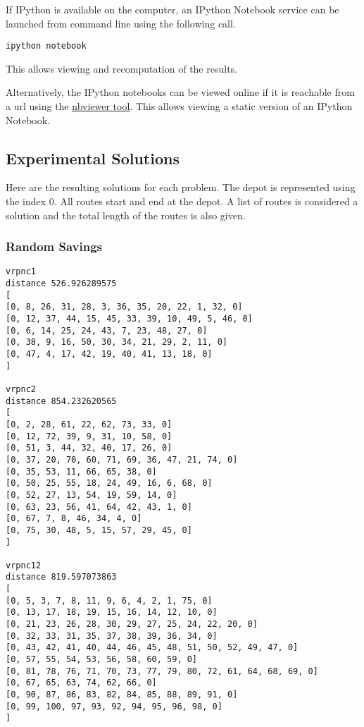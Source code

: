 \documentclass{article} %
\begin{document}
{If IPython is available on the computer, an IPython Notebook service can be launched from command line using the following call.

\begin{verbatim}
ipython notebook    
\end{verbatim}

This allows viewing and recomputation of the results.\newline


Alternatively, the IPython notebooks can be viewed online if it is reachable from a url using the \href{http://nbviewer.IPython.org/}{nbviewer tool}. This allows viewing a static version of an IPython Notebook.



\newpage
\subsection{Experimental Solutions}
Here are the resulting solutions for each problem. The depot is represented using the index 0. All routes start and end at the depot. A list of routes is considered a solution and the total length of the routes is also given.


\subsubsection{Random Savings}
\begin{lstlisting}[breaklines, basicstyle=\tiny]
vrpnc1
distance 526.926289575
[
[0, 8, 26, 31, 28, 3, 36, 35, 20, 22, 1, 32, 0]
[0, 12, 37, 44, 15, 45, 33, 39, 10, 49, 5, 46, 0]
[0, 6, 14, 25, 24, 43, 7, 23, 48, 27, 0]
[0, 38, 9, 16, 50, 30, 34, 21, 29, 2, 11, 0]
[0, 47, 4, 17, 42, 19, 40, 41, 13, 18, 0]
]

vrpnc2
distance 854.232620565
[
[0, 2, 28, 61, 22, 62, 73, 33, 0]
[0, 12, 72, 39, 9, 31, 10, 58, 0]
[0, 51, 3, 44, 32, 40, 17, 26, 0]
[0, 37, 20, 70, 60, 71, 69, 36, 47, 21, 74, 0]
[0, 35, 53, 11, 66, 65, 38, 0]
[0, 50, 25, 55, 18, 24, 49, 16, 6, 68, 0]
[0, 52, 27, 13, 54, 19, 59, 14, 0]
[0, 63, 23, 56, 41, 64, 42, 43, 1, 0]
[0, 67, 7, 8, 46, 34, 4, 0]
[0, 75, 30, 48, 5, 15, 57, 29, 45, 0]
]

vrpnc12
distance 819.597073863
[
[0, 5, 3, 7, 8, 11, 9, 6, 4, 2, 1, 75, 0]
[0, 13, 17, 18, 19, 15, 16, 14, 12, 10, 0]
[0, 21, 23, 26, 28, 30, 29, 27, 25, 24, 22, 20, 0]
[0, 32, 33, 31, 35, 37, 38, 39, 36, 34, 0]
[0, 43, 42, 41, 40, 44, 46, 45, 48, 51, 50, 52, 49, 47, 0]
[0, 57, 55, 54, 53, 56, 58, 60, 59, 0]
[0, 81, 78, 76, 71, 70, 73, 77, 79, 80, 72, 61, 64, 68, 69, 0]
[0, 67, 65, 63, 74, 62, 66, 0]
[0, 90, 87, 86, 83, 82, 84, 85, 88, 89, 91, 0]
[0, 99, 100, 97, 93, 92, 94, 95, 96, 98, 0]
]


\end{lstlisting}}
\end{document}
